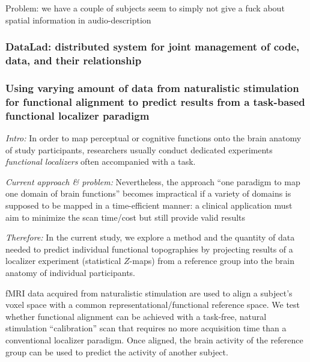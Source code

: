 %
Problem: we have a couple of subjects seem to simply not give a fuck about
spatial information in audio-description


\subsubsection{DataLad: distributed system for joint management of code, data,
and their relationship}



\subsubsection{Using varying amount of data from naturalistic stimulation for
functional alignment to predict results from a task-based functional localizer
paradigm}



\textit{Intro:} In order to map perceptual or cognitive functions onto the brain
anatomy of study participants, researchers usually conduct dedicated experiments
\textit{functional localizers} often accompanied with a task.

\textit{Current approach \& problem:} Nevertheless, the approach ``one paradigm
to map one domain of brain functions'' becomes impractical if a variety of
domains is supposed to be mapped in a time-efficient manner:
%
a clinical application must aim to minimize the scan time/cost but still provide
valid results

\textit{Therefore:} In the current study, we explore a method and the quantity
of data needed to predict individual functional topographies by projecting
results of a localizer experiment (statistical $Z$-maps) from a reference group
into the brain anatomy of individual participants.

%
fMRI data acquired from naturalistic stimulation are used to align a subject's
voxel space with a common representational/functional reference space.
%
We test whether functional alignment can be achieved with a task-free, natural
stimulation ``calibration'' scan that requires no more acquisition time than a
conventional localizer paradigm.
%
Once aligned, the brain activity of the reference group can be used to predict
the activity of another subject.

